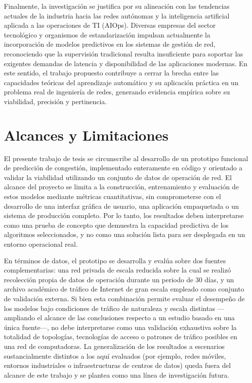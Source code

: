 \documentclass[12pt]{report}
\begin{document}
Finalmente, la investigación se justifica por su alineación con las tendencias actuales de la industria hacia las redes autónomas y la inteligencia artificial aplicada a las operaciones de TI (AIOps). Diversas empresas del sector tecnológico y organismos de estandarización impulsan actualmente la incorporación 
de modelos predictivos en los sistemas de gestión de red, reconociendo que la supervisión tradicional resulta insuficiente para soportar las exigentes demandas de latencia y disponibilidad de las aplicaciones modernas. En este sentido, el trabajo propuesto contribuye a cerrar la brecha entre las capacidades 
teóricas del aprendizaje automático y su aplicación práctica en un problema real de ingeniería de redes, generando evidencia empírica sobre su viabilidad, precisión y pertinencia.

\section{Alcances y Limitaciones} 
\label{sec:alcances}
El presente trabajo de tesis se circunscribe al desarrollo de un prototipo funcional de predicción de congestión, implementado enteramente en código y orientado a validar la viabilidad utilizando un conjunto de datos de operación de red. El alcance del proyecto se limita a la construcción, entrenamiento y evaluación de 
estos modelos mediante métricas cuantitativas, sin comprometerse con el desarrollo de una interfaz gráfica de usuario, una aplicación empaquetada o un sistema de producción completo. Por lo tanto, los resultados deben interpretarse como una prueba de concepto que demuestra la capacidad predictiva de los algoritmos seleccionados, 
y no como una solución lista para ser desplegada en un entorno operacional real.

En términos de datos, el prototipo se desarrolla y evalúa sobre dos fuentes complementarias: una red privada de escala reducida sobre la cual se realizó recolección propia de datos de operación durante un periodo de 30 días, y un archivo académico de tráfico de Internet de gran escala empleado como conjunto de validación externa. 
Si bien esta combinación permite evaluar el desempeño de los modelos bajo condiciones de tráfico de naturaleza y escala distintas —ampliando el alcance de las conclusiones respecto a un estudio basado en una única fuente—, no debe interpretarse como una validación exhaustiva sobre la totalidad de topologías, tecnologías de acceso o 
patrones de tráfico posibles en una red de computadoras. La generalización de los resultados a escenarios sustancialmente distintos a los aquí evaluados (por ejemplo, redes móviles, entornos industriales o infraestructuras de centros de datos) queda fuera del alcance de este trabajo y se plantea como una línea de investigación futura.
\end{document}
